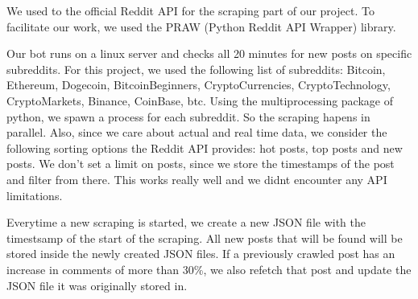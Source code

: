 We used to the official Reddit API for the scraping part of our project. To facilitate our work, we used the PRAW (Python Reddit API Wrapper) library.

Our bot runs on a linux server and checks all 20 minutes for new posts on specific subreddits. For this project, we used the following list of subreddits: Bitcoin, Ethereum, Dogecoin, BitcoinBeginners, CryptoCurrencies, CryptoTechnology, CryptoMarkets, Binance, CoinBase, btc.
Using the multiprocessing package of python, we spawn a process for each subreddit. So the scraping hapens in parallel.
Also, since we care about actual and real time data, we consider the following sorting options the Reddit API provides: hot posts, top posts and new posts. We don't set a limit on posts, since we store the timestamps of the post and filter from there. This works really well and we didnt encounter any API limitations.

Everytime a new scraping is started, we create a new JSON file with the timestsamp of the start of the scraping. All new posts that will be found will be stored inside the newly created JSON files. If a previously crawled post has an increase in comments of more than 30\%, we also refetch that post and update the JSON file it was originally stored in.